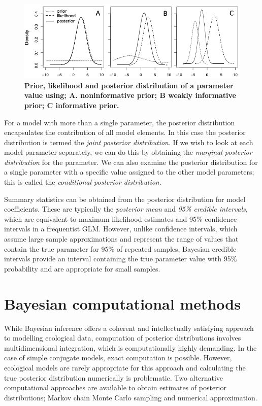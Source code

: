 \documentclass[
]{book}
\begin{document}
\begin{figure}

{\centering \includegraphics[width=1\linewidth]{parameter_fig} 

}

\caption{\textbf{Prior, likelihood and posterior distribution of a parameter value using; A. noninformative prior; B weakly informative prior; C informative prior.}}\label{fig:param-plot}
\end{figure}

For a model with more than a single parameter, the posterior distribution encapsulates the contribution of all model elements. In this case the posterior distribution is termed the \emph{joint posterior distribution}. If we wish to look at each model parameter separately, we can do this by obtaining the \emph{marginal posterior distribution} for the parameter. We can also examine the posterior distribution for a single parameter with a specific value assigned to the other model parameters; this is called the \emph{conditional posterior distribution}.

Summary statistics can be obtained from the posterior distribution for model coefficients. These are typically the \emph{posterior mean} and \emph{95\% credible intervals}, which are equivalent to maximum likelihood estimates and 95\% confidence intervals in a frequentist GLM. However, unlike confidence intervals, which assume large sample approximations and represent the range of values that contain the true parameter for 95\% of repeated samples, Bayesian credible intervals provide an interval containing the true parameter value with 95\% probability and are appropriate for small samples.

\hypertarget{comp-methods}{%
\section{Bayesian computational methods}\label{comp-methods}}

While Bayesian inference offers a coherent and intellectually satisfying approach to modelling ecological data, computation of posterior distributions involves multidimensional integration, which is computationally highly demanding. In the case of simple conjugate models, exact computation is possible. However, ecological models are rarely appropriate for this approach and calculating the true posterior distribution numerically is problematic. Two alternative computational approaches are available to obtain estimates of posterior distributions; Markov chain Monte Carlo sampling and numerical approximation.
\end{document}
